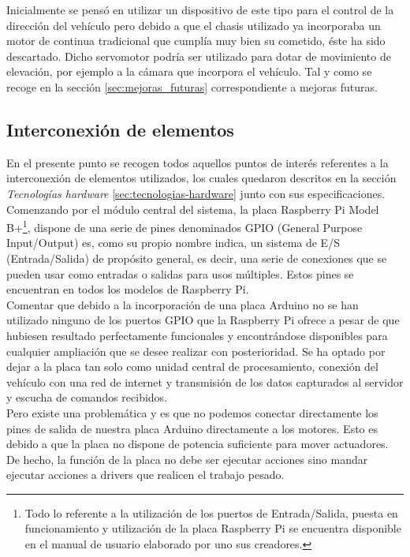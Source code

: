 Inicialmente se pensó en utilizar un dispositivo de este tipo para el control de la dirección del vehículo pero debido a que el chasis utilizado ya incorporaba un motor de continua tradicional
que cumplía muy bien su cometido, éste ha sido descartado. Dicho servomotor podría ser utilizado para dotar de movimiento de elevación, por ejemplo a la cámara que incorpora el vehículo. Tal y como
se recoge en la sección \ref{sec:mejoras_futuras} correspondiente a mejoras futuras.\\

\subsection{Interconexión de elementos}

En el presente punto se recogen todos aquellos puntos de interés referentes a la interconexión de elementos utilizados, los cuales quedaron descritos en la sección \emph{Tecnologías hardware}
\ref{sec:tecnologias-hardware} junto con sus especificaciones.\\

Comenzando por el módulo central del sistema, la placa Raspberry Pi Model B+\footnote{ Todo lo referente a la utilización de los puertos de Entrada/Salida, puesta en funcionamiento y
utilización de la placa Raspberry Pi se encuentra disponible en el manual de usuario \cite{book:Raspberry} elaborado por uno sus creadores. }, dispone de una serie de pines denominados GPIO (General Purpose Input/Output) es, como su propio nombre indica, 
un sistema de E/S (Entrada/Salida) de propósito general, es decir, una serie de conexiones que se pueden usar como entradas o salidas para usos múltiples. Estos pines se encuentran en todos
los modelos de Raspberry Pi.\\

Comentar que debido a la incorporación de una placa Arduino no se han utilizado ninguno de los puertos GPIO que la Raspberry Pi ofrece a pesar de que hubiesen resultado perfectamente 
funcionales y encontrándose disponibles para cualquier ampliación que se desee realizar con posterioridad. Se ha optado por dejar a la placa tan solo como unidad central de 
procesamiento, conexión del vehículo con una red de internet y transmisión de los datos capturados al servidor y escucha de comandos recibidos.\\

Pero existe una problemática y es que no podemos conectar directamente los pines de salida de nuestra placa Arduino directamente a los motores. Esto es debido a
que la placa no dispone de potencia suficiente para mover actuadores. De hecho, la función de la placa no debe ser ejecutar acciones sino mandar ejecutar acciones a drivers que
realicen el trabajo pesado.\\

